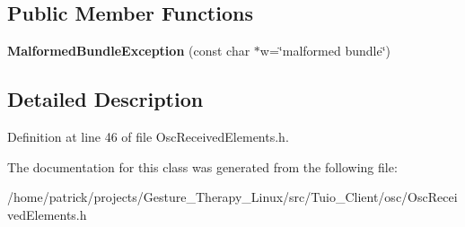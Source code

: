 \subsection*{Public Member Functions}
\begin{DoxyCompactItemize}
\item 
\mbox{\label{classosc_1_1_malformed_bundle_exception_ab050eb691f05c77b4bf84058083c0cf5}} 
{\bfseries Malformed\+Bundle\+Exception} (const char $\ast$w=\char`\"{}malformed bundle\char`\"{})
\end{DoxyCompactItemize}


\subsection{Detailed Description}


Definition at line 46 of file Osc\+Received\+Elements.\+h.



The documentation for this class was generated from the following file\+:\begin{DoxyCompactItemize}
\item 
/home/patrick/projects/\+Gesture\+\_\+\+Therapy\+\_\+\+Linux/src/\+Tuio\+\_\+\+Client/osc/Osc\+Received\+Elements.\+h\end{DoxyCompactItemize}
